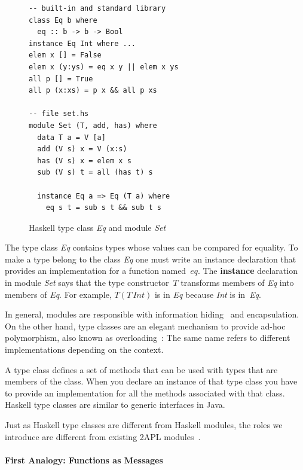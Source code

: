 \documentclass[a4paper,12pt,oneside,fleqn]{book} %
\begin{document}
\begin{figure}\footnotesize %
\begin{verbatim}
-- built-in and standard library
class Eq b where
  eq :: b -> b -> Bool
instance Eq Int where ...
elem x [] = False
elem x (y:ys) = eq x y || elem x ys
all p [] = True
all p (x:xs) = p x && all p xs

-- file set.hs
module Set (T, add, has) where
  data T a = V [a]
  add (V s) x = V (x:s)
  has (V s) x = elem x s
  sub (V s) t = all (has t) s

  instance Eq a => Eq (T a) where
    eq s t = sub s t && sub t s
\end{verbatim}
\caption{Haskell type class \textit{Eq} and module \textit{Set}}
\label{fig:haskell}
\end{figure} %


The type class \textit{Eq} contains types whose values can be compared for
equality. To make a type belong to the class \textit{Eq} one must write an
instance declaration that provides an implementation for a function
named~$eq$. The \textbf{instance} declaration in module \textit{Set} says
that the type constructor~$T$ transforms members of \textit{Eq} into
members of \textit{Eq}. For example, $T(T\,\mathit{Int})$ is in \textit{Eq}
because \textit{Int} is in~\textit{Eq}.

In general, modules are responsible with information
hiding~\cite{DBLP:journals/cacm/Parnas72a} and encapsulation.  On the other
hand, type classes are an elegant mechanism to provide ad-hoc polymorphism,
also known as overloading~\cite{DBLP:conf/popl/WadlerB89}: The same name
refers to different implementations depending on the context.

A type class defines a set of methods that can be used with types that are
members of the class. When you declare an instance of that type class
you have to provide an implementation for all the methods associated with
that class. Haskell type classes are similar to generic interfaces in Java.

Just as Haskell type classes are different from Haskell modules, the roles
we introduce are different from existing 2APL
modules~\cite{dblp:conf/prima/dastanims08}.

\paragraph{First Analogy: Functions as Messages} %
\end{document}
